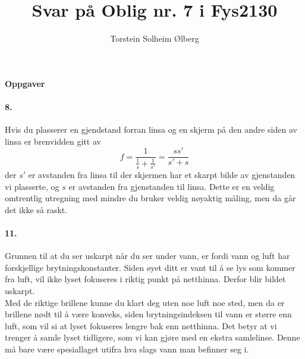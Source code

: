 \documentclass[11pt, A4paper,norsk]{article}
\author{Torstein Solheim Ølberg}
\title{Svar på Oblig nr. 7 i Fys2130}
\begin{document}
\maketitle
	\begin{center}
\Large \textbf{Oppgaver}
	\end{center}









		\paragraph{8.}
			\begin{flushleft}
Hvis du plasserer en gjendstand forran linsa og en skjerm på den andre siden av linsa er brenvidden gitt av
$$f = \frac{1}{\frac{1}{s} + \frac{1}{s'}} = \frac{s s'}{s' + s}$$
der $s'$ er avstanden fra linsa til der skjermen har et skarpt bilde av gjenstanden vi plasserte, og $s$ er avstanden fra gjenstanden til linsa. Dette er en veldig omtrentlig utregning med mindre du bruker veldig nøyaktig måling, men da går det ikke så raskt.
			\end{flushleft}









		\paragraph{11.}
			\begin{flushleft}
Grunnen til at du ser uskarpt når du ser under vann, er fordi vann og luft har forskjellige brytningskonstanter. Siden øyet ditt er vant til å se lys som kommer fra luft, vil ikke lyset fokuseres i riktig punkt på netthinna. Derfor blir bildet uskarpt. \\

Med de riktige brillene kunne du klart deg uten noe luft noe sted, men da er brillene nødt til å være konveks, siden brytningsindeksen til vann er større enn luft, som vil si at lyset fokuseres lengre bak enn netthinna. Det betyr at vi trenger å samle lyset tidligere, som vi kan gjøre med en ekstra samlelinse. Denne må bare være spesiallaget utifra hva slags vann man befinner seg i.
			\end{flushleft}
\end{document}
